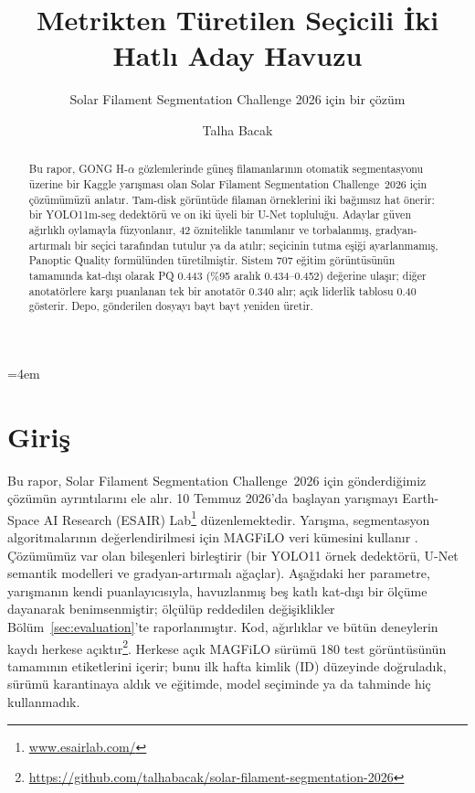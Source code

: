 \documentclass[sigconf]{acmart}
\begin{document}
\emergencystretch=4em %

\title{Metrikten Türetilen Seçicili İki Hatlı Aday Havuzu}
\subtitle{Solar Filament Segmentation Challenge 2026 için bir çözüm}

\author{Talha Bacak}

\begin{abstract}
    Bu rapor, GONG H-$\alpha$ gözlemlerinde güneş filamanlarının otomatik segmentasyonu üzerine bir Kaggle yarışması olan Solar Filament Segmentation Challenge~2026 için çözümümüzü anlatır. Tam-disk görüntüde filaman örneklerini iki bağımsız hat önerir: bir YOLO11m-seg dedektörü ve on iki üyeli bir U-Net topluluğu. Adaylar güven ağırlıklı oylamayla füzyonlanır, 42 öznitelikle tanımlanır ve torbalanmış, gradyan-artırmalı bir seçici tarafından tutulur ya da atılır; seçicinin tutma eşiği ayarlanmamış, Panoptic Quality formülünden türetilmiştir. Sistem 707 eğitim görüntüsünün tamamında kat-dışı olarak PQ 0.443 (\%95 aralık 0.434--0.452) değerine ulaşır; diğer anotatörlere karşı puanlanan tek bir anotatör 0.340 alır; açık liderlik tablosu 0.40 gösterir. Depo, gönderilen dosyayı bayt bayt yeniden üretir.
\end{abstract}

\maketitle

\section{Giriş}
    Bu rapor, Solar Filament Segmentation Challenge~2026 \cite{filament-segmentation-2026} için gönderdiğimiz çözümün ayrıntılarını ele alır. 10 Temmuz 2026'da başlayan yarışmayı Earth-Space AI Research (ESAIR) Lab\footnote{\href{https://www.esairlab.com/home}{www.esairlab.com/}} düzenlemektedir. Yarışma, segmentasyon algoritmalarının değerlendirilmesi için MAGFiLO veri kümesini kullanır \cite{ahmadzadeh2024dataset}. Çözümümüz var olan bileşenleri birleştirir (bir YOLO11 örnek dedektörü, U-Net semantik modelleri ve gradyan-artırmalı ağaçlar). Aşağıdaki her parametre, yarışmanın kendi puanlayıcısıyla, havuzlanmış beş katlı kat-dışı bir ölçüme dayanarak benimsenmiştir; ölçülüp reddedilen değişiklikler Bölüm~\ref{sec:evaluation}'te raporlanmıştır. Kod, ağırlıklar ve bütün deneylerin kaydı herkese açıktır\footnote{\url{https://github.com/talhabacak/solar-filament-segmentation-2026}}. Herkese açık MAGFiLO sürümü 180 test görüntüsünün tamamının etiketlerini içerir; bunu ilk hafta kimlik (ID) düzeyinde doğruladık, sürümü karantinaya aldık ve eğitimde, model seçiminde ya da tahminde hiç kullanmadık.
\end{document}
